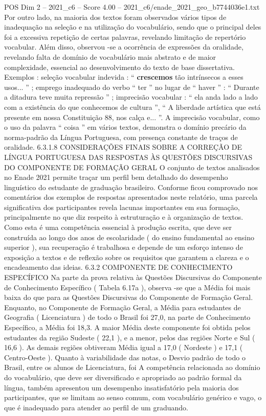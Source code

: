 \begin{textsample}{POS Dim 2 – 2021\_c6 – Score 4.00 – 2021\_c6/enade\_2021\_geo\_b7744036e1.txt}
Por outro lado, na maioria dos textos foram observados vários tipos de inadequação na seleção e na utilização do vocabulário, sendo que o principal deles foi a excessiva repetição de certas palavras, revelando limitação de repertório vocabular.
Além disso, observou -se a ocorrência de expressões da oralidade, revelando falta de domínio de vocabulário mais abstrato e de maior complexidade, essencial ao desenvolvimento do texto de base dissertativa.
Exemplos : seleção vocabular indevida : “ \textbf{crescemos} tão intrínsecos a esses usos... ” ; emprego inadequado do verbo “ ter ” no lugar de “ haver ” : “ Durante a ditadura teve muita repressão ” ; imprecisão vocabular : “ ela anda lado a lado com a existência do que conhecemos de cultura ”, “ A liberdade artística que está presente em nossa Constituição 88, nos calça e... ”.
A imprecisão vocabular, como o uso da palavra “ coisa ” em vários textos, demonstra o domínio precário da norma-padrão da Língua Portuguesa, com presença constante de traços de oralidade. 6.3.1.8 CONSIDERAÇÕES FINAIS SOBRE A CORREÇÃO DE LÍNGUA PORTUGUESA DAS RESPOSTAS ÀS QUESTÕES DISCURSIVAS DO COMPONENTE DE FORMAÇÃO GERAL O conjunto de textos analisados no Enade 2021 permite traçar um perfil bem detalhado do desempenho linguístico do estudante de graduação brasileiro.
Conforme ficou comprovado nos comentários dos exemplos de respostas apresentados neste relatório, uma parcela significativa dos participantes revela lacunas importantes em sua formação, principalmente no que diz respeito à estruturação e à organização de textos.
Como esta é uma competência essencial à produção escrita, que deve ser construída ao longo dos anos de escolaridade ( do ensino fundamental ao ensino superior ), sua recuperação é trabalhosa e depende de um esforço intenso de exposição a textos e de reflexão sobre os requisitos que garantem a clareza e o encadeamento das ideias. 6.3.2 COMPONENTE DE CONHECIMENTO ESPECÍFICO Na parte da prova relativa às Questões Discursivas do Componente de Conhecimento Específico ( Tabela 6.17a ), observa -se que a Média foi mais baixa do que para as Questões Discursivas do Componente de Formação Geral.
Enquanto, no Componente de Formação Geral, a Média para estudantes de Geografia ( Licenciatura ) de todo o Brasil foi 27,0, na parte de Conhecimento Específico, a Média foi 18,3.
A maior Média deste componente foi obtida pelos estudantes da região Sudeste ( 22,1 ), e a menor, pelos das regiões Norte e Sul ( 16,6 ).
As demais regiões obtiveram Média igual a 17,0 ( Nordeste ) e 17,1 ( Centro-Oeste ).
Quanto à variabilidade das notas, o Desvio padrão de todo o Brasil, entre os alunos de Licenciatura, foi A competência relacionada ao domínio do vocabulário, que deve ser diversificado e apropriado ao padrão formal da língua, também apresentou um desempenho insatisfatório pela maioria dos participantes, que se limitam ao senso comum, com vocabulário genérico e vago, o que é inadequado para atender ao perfil de um graduando.

\end{textsample}
